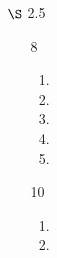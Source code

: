 \documentclass[12pt,letterpaper]{article}
\begin{document}
\begin{enumerate}
\begin{enumerate}
\begin{enumerate}[label=(\arabic*)]
            \item
            \item
            \item
            \item
            \item
            \item
            \item
          \end{enumerate}
      \end{enumerate}
    \item [$\S$ 2.5]
      \begin{enumerate}
        \item [8]
          \begin{enumerate}[label=(\arabic*)]
            \item
            \item
            \item
            \item
            \item
          \end{enumerate}
        \item [10]
          \begin{enumerate}[label=(\arabic*)]
            \item
            \item
          \end{enumerate}
      \end{enumerate}
  \end{enumerate}
\end{document}
